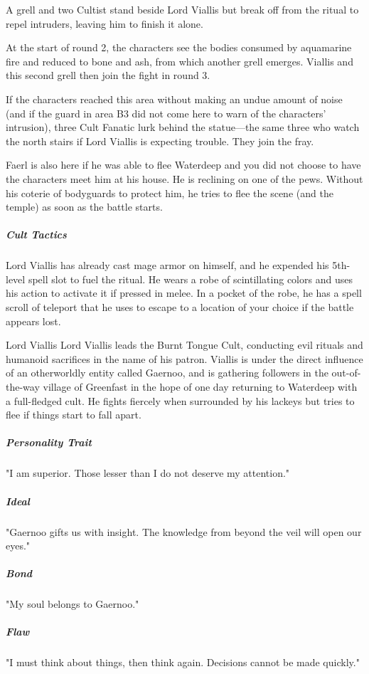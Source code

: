 \documentclass[10pt,a4paper,twoside,bg=print,twocolumn,openany,nodeprecatedcode]{dndbook}
\begin{document}
A grell and two Cultist stand beside Lord Viallis but break off from the ritual to repel intruders, leaving him to finish it alone.

At the start of round 2, the characters see the bodies consumed by aquamarine fire and reduced to bone and ash, from which another grell emerges. Viallis and this second grell then join the fight in round 3.

If the characters reached this area without making an undue amount of noise (and if the guard in area B3 did not come here to warn of the characters' intrusion), three Cult Fanatic lurk behind the statue—the same three who watch the north stairs if Lord Viallis is expecting trouble. They join the fray.

Faerl is also here if he was able to flee Waterdeep and you did not choose to have the characters meet him at his house. He is reclining on one of the pews. Without his coterie of bodyguards to protect him, he tries to flee the scene (and the temple) as soon as the battle starts.

\subparagraph{Cult Tactics}
Lord Viallis has already cast mage armor on himself, and he expended his 5th-level spell slot to fuel the ritual. He wears a robe of scintillating colors and uses his action to activate it if pressed in melee. In a pocket of the robe, he has a spell scroll of teleport that he uses to escape to a location of your choice if the battle appears lost.

\begin{DndSidebar}[float=!b]{Lord Viallis}
Lord Viallis leads the Burnt Tongue Cult, conducting evil rituals and humanoid sacrifices in the name of his patron. Viallis is under the direct influence of an otherworldly entity called Gaernoo, and is gathering followers in the out-of-the-way village of Greenfast in the hope of one day returning to Waterdeep with a full-fledged cult. He fights fiercely when surrounded by his lackeys but tries to flee if things start to fall apart.



\subparagraph{Personality Trait}
"I am superior. Those lesser than I do not deserve my attention."



\subparagraph{Ideal}
"Gaernoo gifts us with insight. The knowledge from beyond the veil will open our eyes."



\subparagraph{Bond}
"My soul belongs to Gaernoo."



\subparagraph{Flaw}
"I must think about things, then think again. Decisions cannot be made quickly."



\end{DndSidebar}
\end{document}
